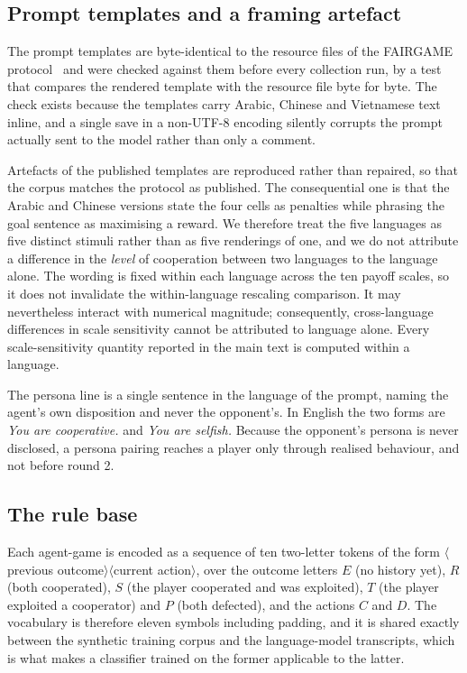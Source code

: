 \documentclass[openacc]{rsproca_new}
\begin{document}
\subsection{Prompt templates and a framing artefact}\label{appendix:templates}

The prompt templates are byte-identical to the resource files of the FAIRGAME
protocol~\cite{buscemi2025fairgame} and were checked against them before every
collection run, by a test that compares the rendered template with the resource
file byte for byte. The check exists because the templates carry Arabic,
Chinese and Vietnamese text inline, and a single save in a non-UTF-8 encoding
silently corrupts the prompt actually sent to the model rather than only a
comment.

Artefacts of the published templates are reproduced rather than repaired, so
that the corpus matches the protocol as published. The consequential one is
that the Arabic and Chinese versions state the four cells as penalties while
phrasing the goal sentence as maximising a reward. We therefore treat the five
languages as five distinct stimuli rather than as five renderings of one, and
we do not attribute a difference in the \emph{level} of cooperation between two
languages to the language alone. The wording is fixed within each language
across the ten payoff scales, so it does not invalidate the within-language
rescaling comparison. It may nevertheless interact with numerical magnitude;
consequently, cross-language differences in scale sensitivity cannot be
attributed to language alone. Every scale-sensitivity quantity reported in the
main text is computed within a language.

The persona line is a single sentence in the language of the prompt, naming
the agent's own disposition and never the opponent's. In English the two forms
are \emph{You are cooperative.} and \emph{You are selfish.} Because the
opponent's persona is never disclosed, a persona pairing reaches a player only
through realised behaviour, and not before round 2.

\subsection{The rule base}\label{appendix:rule_based}

Each agent-game is encoded as a sequence of ten two-letter tokens of the form
$\langle$previous outcome$\rangle\langle$current action$\rangle$, over the
outcome letters $E$ (no history yet), $R$ (both cooperated), $S$ (the player
cooperated and was exploited), $T$ (the player exploited a cooperator) and $P$
(both defected), and the actions $C$ and $D$. The vocabulary is therefore
eleven symbols including padding, and it is shared exactly between the
synthetic training corpus and the language-model transcripts, which is what
makes a classifier trained on the former applicable to the latter.
\end{document}
